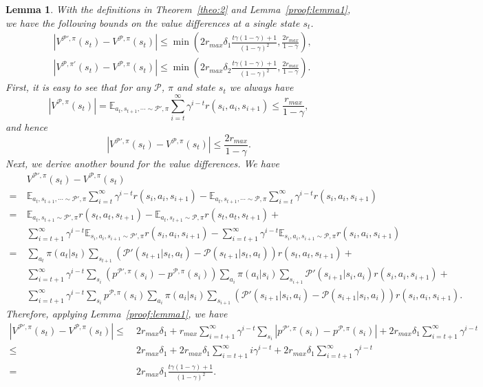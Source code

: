 \documentclass[letterpaper]{article} %
\def\E{{\mathbb{E}}}
\def\P{{\mathcal{P}}}
\newtheorem{lemma}[theorem]{Lemma}
\begin{document}
\begin{lemma}
\label{proof:lemma2}
With the definitions in Theorem~\ref{theo:2} and Lemma~\ref{proof:lemma1}, we have the following bounds on the value differences at a single state $s_t$.
{\small
\begin{align}
&\left|V^{\P',\pi}(s_t)-V^{\P,\pi}(s_t)\right|\leq
\min\left(2r_{max}\delta_1\frac{t\gamma(1-\gamma)+1}{(1-\gamma)^2}, 
\frac{2r_{max}}{1-\gamma}\right),
\label{eq:vd_diff}
\\
&\left|V^{\P,\pi'}(s_t)-V^{\P,\pi}(s_t)\right|\leq
\min\left(2r_{max}\delta_2\frac{t\gamma(1-\gamma)+1}{(1-\gamma)^2}, \frac{2r_{max}}{1-\gamma}\right).
\label{eq:vp_diff}
\end{align}
}\noindent
\proof
First, it is easy to see that for any $\P$, $\pi$ and state $s_t$ we always have
{\small
\[
\left|V^{\P,\pi}(s_t)\right|=\E_{a_t,s_{t+1},\cdots\sim\P',\pi}\sum_{i=t}^{\infty}\gamma^{i-t}r(s_i,a_i,s_{i+1})
\leq\frac{r_{max}}{1-\gamma},
\]
}\noindent
and hence
{\small
\[
\left|V^{\P',\pi}(s_t)-V^{\P,\pi}(s_t)\right|
\leq\frac{2r_{max}}{1-\gamma}.
\]
}\noindent
Next, we derive another bound for the value differences. We have
{\small
\begin{align*}
&V^{\P',\pi}(s_t)-V^{\P,\pi}(s_t)
\\
=\ &\E_{a_t,s_{t+1},\cdots\sim\P',\pi}\sum_{i=t}^{\infty}\gamma^{i-t}r(s_i,a_i,s_{i+1})-
\E_{a_t,s_{t+1},\cdots\sim\P,\pi}\sum_{i=t}^{\infty}\gamma^{i-t}r(s_i,a_i,s_{i+1})
\\
=\ &\E_{a_t,s_{t+1}\sim\P',\pi}r(s_t,a_t,s_{t+1})-\E_{a_t,s_{t+1}\sim\P,\pi}r(s_t,a_t,s_{t+1})+
\\
\ &\sum_{i=t+1}^{\infty}\gamma^{i-t}\E_{s_i,a_i,s_{i+1}\sim\P',\pi}r(s_i,a_i,s_{i+1})-
\sum_{i=t+1}^{\infty}\gamma^{i-t}\E_{s_i,a_i,s_{i+1}\sim\P,\pi}r(s_i,a_i,s_{i+1})
\\
=\ &\sum_{a_t}\pi(a_t|s_t)
\sum_{s_{t+1}}\left(\P'(s_{t+1}|s_t,a_t)-\P(s_{t+1}|s_t,a_t)\right)r(s_t,a_t,s_{t+1})+
\\
\ &\sum_{i=t+1}^{\infty}\gamma^{i-t}\sum_{s_i}
\left(p^{\P',\pi}(s_i)-p^{\P,\pi}(s_i)\right)
\sum_{a_i}\pi(a_i|s_i)
\sum_{s_{i+1}}\P'(s_{i+1}|s_i,a_i)
r(s_i,a_i,s_{i+1})+
\\
\ &\sum_{i=t+1}^{\infty}\gamma^{i-t}\sum_{s_i}p^{\P,\pi}(s_i)
\sum_{a_i}\pi(a_i|s_i)
\sum_{s_{i+1}}\left(\P'(s_{i+1}|s_i,a_i)-\P(s_{i+1}|s_i,a_i)\right)
r(s_i,a_i,s_{i+1}).
\end{align*}
}\noindent
Therefore, applying Lemma~\ref{proof:lemma1}, we have
{\small
\begin{align*}
\left|V^{\P',\pi}(s_t)-V^{\P,\pi}(s_t)\right|
\leq\ &
2r_{max}\delta_1+
r_{max}\sum_{i=t+1}^{\infty}\gamma^{i-t}\sum_{s_i}\left|p^{\P',\pi}(s_i)-p^{\P,\pi}(s_i)\right|+
2r_{max}\delta_1\sum_{i=t+1}^{\infty}\gamma^{i-t}
\\
\leq\ &2r_{max}\delta_1+2r_{max}\delta_1\sum_{i=t+1}^{\infty}i\gamma^{i-t}
+2r_{max}\delta_1\sum_{i=t+1}^{\infty}\gamma^{i-t}
\\
=\ &
2r_{max}\delta_1\frac{t\gamma(1-\gamma)+1}{(1-\gamma)^2}.
\end{align*}
}\noindent


\end{lemma}
\end{document}
